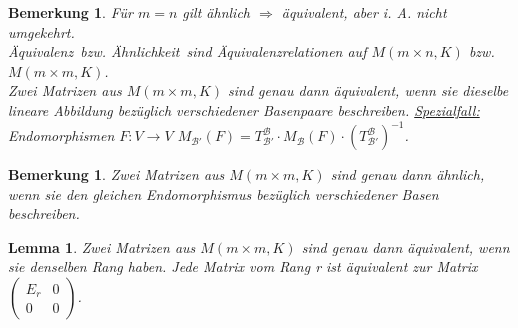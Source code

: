 \documentclass[12pt,a4paper]{article}
\theoremstyle{plain}
\newtheorem{Lemma}[Theorem]{Lemma}
\newtheorem{Bemerkung}[Theorem]{Bemerkung}
\numberwithin{equation}{section}
\begin{document}
\begin{Bemerkung}
Für $m=n$ gilt ähnlich $\Rightarrow$ äquivalent, aber i. A. nicht umgekehrt.\\
\glqq Äquivalenz\grqq\ bzw. \glqq Ähnlichkeit\grqq\ sind Äquivalenzrelationen auf $M(m\times n,K)$ bzw. $M(m\times m,K)$. \\
Zwei Matrizen aus $M(m\times m,K)$ sind genau dann äquivalent, wenn sie dieselbe lineare Abbildung bezüglich verschiedener Basenpaare beschreiben. \underline{Spezialfall:} Endomorphismen $F:V \rightarrow V$ $M_\mathcal{B'}(F)=T^\mathcal{B}_\mathcal{B'}\cdot M_\mathcal{B}(F)\cdot \left(T^\mathcal{B}_\mathcal{B'} \right)^{-1}$.
\end{Bemerkung}
\begin{Bemerkung}
Zwei Matrizen aus $M(m\times m,K)$ sind genau dann ähnlich, wenn sie den gleichen Endomorphismus bezüglich verschiedener Basen beschreiben.
\end{Bemerkung}
\begin{Lemma}
Zwei Matrizen aus $M(m\times m,K)$ sind genau dann äquivalent, wenn sie denselben Rang haben. Jede Matrix vom Rang r ist äquivalent zur Matrix $\left(\begin{matrix} E_r & 0 \\ 0 & 0 \end{matrix} \right)$.
\end{Lemma}
\end{document}
